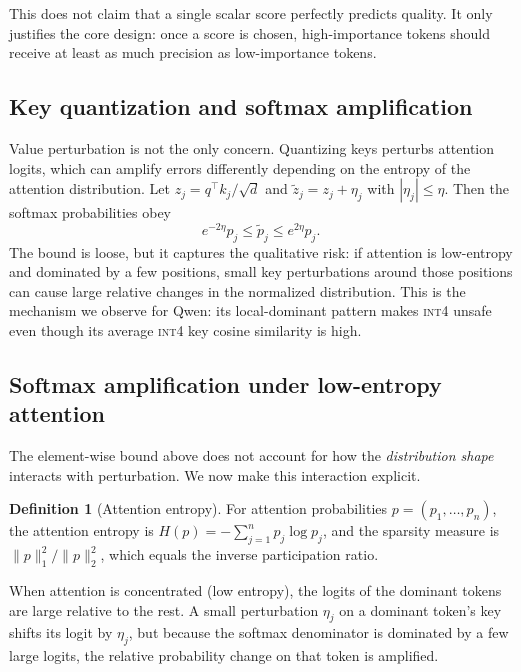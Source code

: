 \documentclass[11pt]{article}
\newcommand{\intiv}{\textsc{int4}}
\theoremstyle{plain}
\theoremstyle{definition}
\newtheorem{definition}{Definition}
\begin{document}
This does not claim that a single scalar score perfectly predicts quality.  It only justifies the core design: once a score is chosen, high-importance tokens should receive at least as much precision as low-importance tokens.

\subsection{Key quantization and softmax amplification}
Value perturbation is not the only concern.  Quantizing keys perturbs attention logits, which can amplify errors differently depending on the entropy of the attention distribution.  Let $z_j=q^\top k_j/\sqrt{d}$ and $\tilde z_j=z_j+\eta_j$ with $|\eta_j|\le \eta$.  Then the softmax probabilities obey
\begin{equation}
  e^{-2\eta}p_j \le \tilde p_j \le e^{2\eta}p_j .
\end{equation}
The bound is loose, but it captures the qualitative risk: if attention is low-entropy and dominated by a few positions, small key perturbations around those positions can cause large relative changes in the normalized distribution.  This is the mechanism we observe for Qwen: its local-dominant pattern makes \intiv{} unsafe even though its average \intiv{} key cosine similarity is high.

\subsection{Softmax amplification under low-entropy attention}
\label{sec:softmax-amp}

The element-wise bound above does not account for how the \emph{distribution shape} interacts with perturbation.  We now make this interaction explicit.

\begin{definition}[Attention entropy]
For attention probabilities $p=(p_1,\ldots,p_n)$, the attention entropy is $H(p)=-\sum_{j=1}^n p_j\log p_j$, and the sparsity measure is $\|p\|_1^2/\|p\|_2^2$, which equals the inverse participation ratio.
\end{definition}

When attention is concentrated (low entropy), the logits of the dominant tokens are large relative to the rest.  A small perturbation $\eta_j$ on a dominant token's key shifts its logit by $\eta_j$, but because the softmax denominator is dominated by a few large logits, the relative probability change on that token is amplified.
\end{document}
